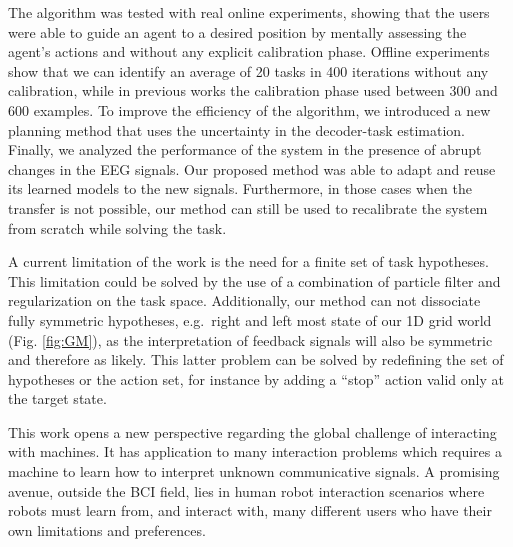 The algorithm was tested with real online experiments, showing that the users were able to guide an agent to a desired position by mentally assessing the agent's actions and without any explicit calibration phase. Offline experiments show that we can identify an average of 20 tasks in 400 iterations without any calibration, while in previous works the calibration phase used between 300 and 600 examples. To improve the efficiency of the algorithm, we introduced a new planning method that uses the uncertainty in the decoder-task estimation. Finally, we analyzed the performance of the system in the presence of abrupt changes in the EEG signals. Our proposed method was able to adapt and reuse its learned models to the new signals. Furthermore, in those cases when the transfer is not possible, our method can still be used to recalibrate the system from scratch while solving the task.

A current limitation of the work is the need for a finite set of task hypotheses. This limitation could be solved by the use of a combination of particle filter and regularization on the task space. Additionally, our method can not dissociate fully symmetric hypotheses, e.g.\ right and left most state of our 1D grid world (Fig. \ref{fig:GM}), as the interpretation of feedback signals will also be symmetric and therefore as likely. This latter problem can be solved by redefining the set of hypotheses or the action set, for instance by adding a ``stop'' action valid only at the target state.

This work opens a new perspective regarding the global challenge of interacting with machines. It has application to many interaction problems which requires a machine to learn how to interpret unknown communicative signals. A promising avenue, outside the BCI field, lies in human robot interaction scenarios where robots must learn from, and interact with, many different users who have their own limitations and preferences.

